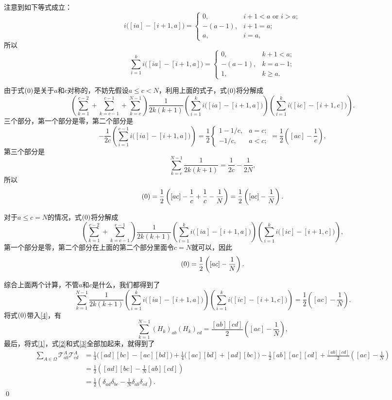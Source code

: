 \documentclass[9pt]{extarticle}
\begin{document}
注意到如下等式成立：
\[
	i\bigl([ia]-[i+1,a]\bigr)=
	\begin{cases}
	0,& i+1<a \text{ or } i>a;\\
	-(a-1),&i+1=a;\\
	a,&i=a,
	\end{cases}
\]
所以
\[
	\sum_{i=1}^ki\bigl([ia]-[i+1,a]\bigr)=
	\begin{cases}
	0,& k+1<a;\\
	-(a-1),&k=a-1;\\
	1,&k\geq a.
	\end{cases}
\]

由于式$(\theequation)$是关于$a$和$c$对称的，不妨先假设$a\leq c<N$，利用上面的式子，式$(\theequation)$将分解成
\[
\left(\sum_{k=1}^{c-2}+\sum_{k=c-1}^{c-1}+\sum_{k=c}^{N-1}\right)\frac{1}{2k(k+1)}\left(\sum_{i=1}^k i\bigl([ia]-[i+1,a]\bigr)\right)\left(\sum_{i=1}^k i\bigl([ic]-[i+1,c]\bigr)\right).
\]
三个部分，第一个部分是零，第二个部分是
\[
	-\frac{1}{2c}\left(\sum_{i=1}^{c-1} i\bigl([ia]-[i+1,a]\bigr)\right)=\frac{1}{2}
	\begin{cases}
	1-1/c,& a=c;\\
	-1/c,&a<c;
	\end{cases}=\frac{1}{2}\left([ac]-\frac{1}{c}\right),
\]
第三个部分是
\[
	\sum_{k=c}^{N-1}\frac{1}{2k(k+1)}=\frac{1}{2c}-\frac{1}{2N},
\]
所以
\[
	(\theequation)=\frac{1}{2}\left([ac]-\frac{1}{c}+\frac{1}{c}-\frac{1}{N}\right)=\frac{1}{2}\left([ac]-\frac{1}{N}\right).
\]

对于$a\leq c=N$的情况，式$(\theequation)$将分解成
\[
\left(\sum_{k=1}^{c-2}+\sum_{k=c-1}^{c-1}\right)\frac{1}{2k(k+1)}\left(\sum_{i=1}^k i\bigl([ia]-[i+1,a]\bigr)\right)\left(\sum_{i=1}^k i\bigl([ic]-[i+1,c]\bigr)\right),
\]
第一个部分是零，第二个部分在上面的第二个部分里面令$c=N$就可以，因此
\[
	(\theequation)=\frac{1}{2}\left([ac]-\frac{1}{N}\right).
\]

综合上面两个计算，不管$a$和$c$是什么，我们都得到了
\begin{equation}
	\sum_{k=1}^{N-1}\frac{1}{2k(k+1)}\left(\sum_{i=1}^k i\bigl([ia]-[i+1,a]\bigr)\right)\left(\sum_{i=1}^k i\bigl([ic]-[i+1,c]\bigr)\right)=\frac{1}{2}\left([ac]-\frac{1}{N}\right).
\end{equation}
将式$(\theequation)$带入\eqref{4}，有
\begin{equation}
\label{3}
\sum_{k=1}^{N-1}(H_k)_{ab}(H_k)_{cd}=\frac{[ab][cd]}{2}\left([ac]-\frac{1}{N}\right),
\end{equation}
最后，将式\eqref{1}，式\eqref{2}和式\eqref{3}全部加起来，就得到了
\[
\begin{split}
	\sum_{A\in \Omega}\mathcal{T}^A_{ab}\mathcal{T}^A_{cd}&=\frac{1}{4}\bigl([ad][bc]-[ac][bd]\bigr)+\frac{1}{4}\bigl([ac][bd]+[ad][bc]\bigr)-\frac{1}{2}[ab][ac][cd]+\frac{[ab][cd]}{2}\left([ac]-\frac{1}{N}\right)\\
	&=\frac{1}{2}\left([ad][bc]-\frac{1}{N}[ab][cd]\right)\\
	&=\frac{1}{2}\left(\delta_{ad}\delta_{bc}-\frac{1}{N}\delta_{ab}\delta_{cd}\right).
\end{split}
\]
\qed
\end{document}
